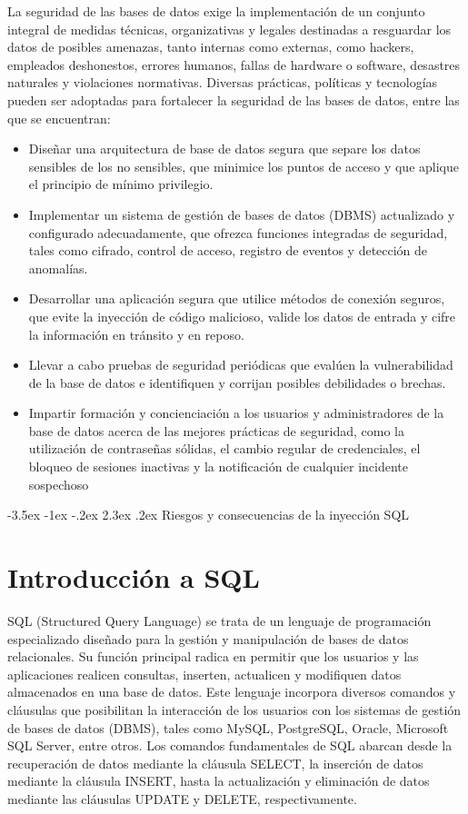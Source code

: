 \documentclass[11pt]{report}
\makeatletter
\renewcommand\chapter{\@startsection{chapter}{0}{\z@}%
    {-3.5ex \@plus -1ex \@minus -.2ex}%
    {2.3ex \@plus.2ex}%
    {\normalfont\Large\bfseries}}
\makeatother
\begin{document}
La seguridad de las bases de datos exige la implementación de un conjunto integral de
medidas técnicas, organizativas y legales destinadas a resguardar los datos de posibles
amenazas, tanto internas como externas, como hackers, empleados deshonestos, errores
humanos, fallas de hardware o software, desastres naturales y violaciones normativas.
Diversas prácticas, políticas y tecnologías pueden ser adoptadas para fortalecer la
seguridad de las bases de datos, entre las que se encuentran:
\begin{itemize}
  \item Diseñar una arquitectura de base de datos segura que separe los datos sensibles de
  los no sensibles, que minimice los puntos de acceso y que aplique el principio de
  mínimo privilegio.
  \item Implementar un sistema de gestión de bases de datos (DBMS) actualizado y
  configurado adecuadamente, que ofrezca funciones integradas de seguridad, tales
  como cifrado, control de acceso, registro de eventos y detección de anomalías.
  \item Desarrollar una aplicación segura que utilice métodos de conexión seguros, que
  evite la inyección de código malicioso, valide los datos de entrada y cifre la
  información en tránsito y en reposo.
  \item Llevar a cabo pruebas de seguridad periódicas que evalúen la vulnerabilidad de la
  base de datos e identifiquen y corrijan posibles debilidades o brechas.
  \item Impartir formación y concienciación a los usuarios y administradores de la base de
  datos acerca de las mejores prácticas de seguridad, como la utilización de
  contraseñas sólidas, el cambio regular de credenciales, el bloqueo de sesiones
  inactivas y la notificación de cualquier incidente sospechoso
\end{itemize}

\cleardoublepage

\chapter{Riesgos y consecuencias de la inyección SQL}
\section{Introducción a SQL}
SQL (Structured Query Language) se trata de un lenguaje de programación especializado
diseñado para la gestión y manipulación de bases de datos relacionales. Su función
principal radica en permitir que los usuarios y las aplicaciones realicen consultas, inserten,
actualicen y modifiquen datos almacenados en una base de datos.
Este lenguaje incorpora diversos comandos y cláusulas que posibilitan la interacción de los
usuarios con los sistemas de gestión de bases de datos (DBMS), tales como MySQL,
PostgreSQL, Oracle, Microsoft SQL Server, entre otros. Los comandos fundamentales de
SQL abarcan desde la recuperación de datos mediante la cláusula SELECT, la inserción de
datos mediante la cláusula INSERT, hasta la actualización y eliminación de datos mediante
las cláusulas UPDATE y DELETE, respectivamente.
\end{document}
